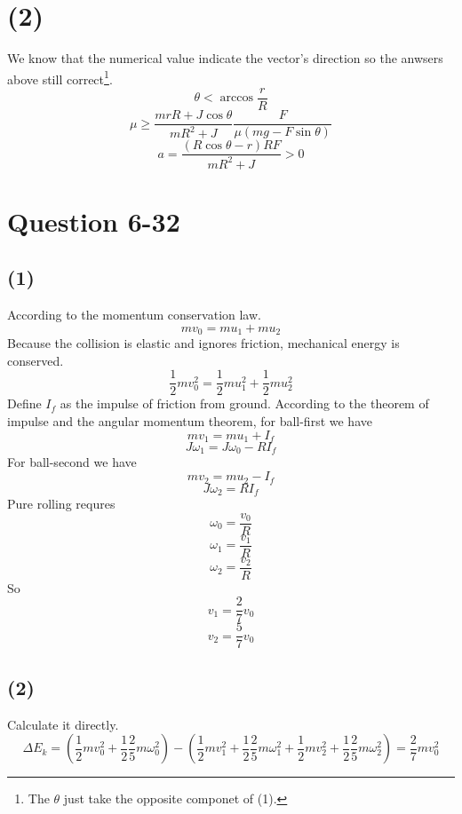 \documentclass[12pt,a4paper]{article}%
\begin{document}
	\section*{(2)}
	We know that the numerical value indicate the vector's direction so the anwsers above still correct\footnote{The $ \theta$ just take the opposite componet of (1).}.
	$$
	\theta<\arccos\frac{r}{R}
	$$
	$$
	\mu \geqslant \frac{mrR+J\cos \theta}{mR^2+J}\frac{F}{\mu \left( mg-F\sin \theta \right)}
	$$
	$$
	a=\frac{\left( R\cos \theta -r \right) RF}{mR^2+J}>0
	$$ 
	\section{Question 6-32}
	\subsection*{(1)}
	\noindent According to the momentum conservation law.
	\begin{equation}
		mv_0=mu_1+mu_2
	\end{equation}
	Because the collision is elastic and ignores friction, mechanical energy is conserved.
	\begin{equation}
		\frac{1}{2}mv_0^2=\frac{1}{2}mu_1^2+\frac{1}{2}mu_2^2
	\end{equation}
	Define $I_f$ as the impulse of friction from ground. According to the theorem of impulse and the angular momentum theorem, for ball-first we have
	\begin{equation}
		mv_1=mu_1+I_f
	\end{equation}
	\begin{equation}
		J\omega_1=J\omega_0-RI_f
	\end{equation}
	For ball-second we have
	\begin{equation}
		mv_2=mu_2-I_f
	\end{equation}
	\begin{equation}
		J\omega_2=RI_f
	\end{equation}
	Pure rolling requres
	\begin{equation}
		\omega_0=\frac{v_0}{R}
	\end{equation}
	\begin{equation}
		\omega_1=\frac{v_1}{R}
	\end{equation}
	\begin{equation}
		\omega_2=\frac{v_2}{R}
	\end{equation}
	So
	$$
	v_1=\frac{2}{7}v_0
	$$
	$$
	v_2=\frac{5}{7}v_0
	$$
	\subsection*{(2)}
	\noindent Calculate it directly.
	$$
	\Delta E_k=(\frac{1}{2}mv_0^2+\frac{1}{2}\frac{2}{5}m\omega_0^2)-(\frac{1}{2}mv_1^2+\frac{1}{2}\frac{2}{5}m\omega_1^2+\frac{1}{2}mv_2^2+\frac{1}{2}\frac{2}{5}m\omega_2^2)=\frac{2}{7}mv_0^2
	$$
\end{document}
